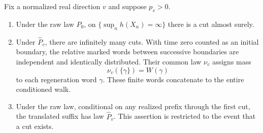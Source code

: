\begin{proposition}\label{prop:cut-law}
Fix a normalized real direction \(v\) and suppose \(p_v>0\).
\begin{enumerate}[label=(\roman*),leftmargin=*]
 \item Under the raw law \(P_0\), on
       \(\{\sup_n h(X_n)=\infty\}\) there is a cut almost surely.
 \item Under \(\widehat P_v\), there are infinitely many cuts.  With
       time zero counted as an initial boundary, the relative marked
       words between successive boundaries are independent and
       identically distributed.  Their common law \(\nu_v\) assigns
       mass
       \begin{equation}\label{eq:regeneration-word-law}
        \nu_v(\{\gamma\})=W(\gamma)
       \end{equation}
       to each regeneration word \(\gamma\).  These finite words
       concatenate to the entire conditioned walk.
 \item Under the raw law, conditional on any realized prefix through
       the first cut, the translated suffix has law
       \(\widehat P_v\).  This assertion is restricted to the event
       that a cut exists.
\end{enumerate}
\end{proposition}

